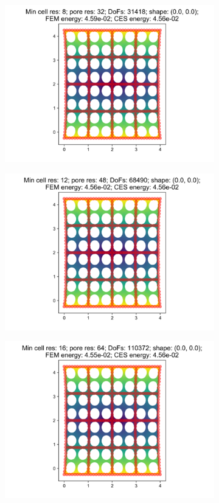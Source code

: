 \begin{figure}[H]
\begin{subfigure}{.45\textwidth}
\end{subfigure}
\begin{subfigure}{.45\textwidth}
  \centering
  \includegraphics[width=.8\linewidth]{lces/vis_tension/bm_4_mesh_3.png}
\end{subfigure}
\newline
\begin{subfigure}{.45\textwidth}
  \centering
  \includegraphics[width=.8\linewidth]{lces/vis_tension/bm_4_mesh_4.png}
\end{subfigure}
\begin{subfigure}{.45\textwidth}
  \centering
  \includegraphics[width=.8\linewidth]{lces/vis_tension/bm_4_mesh_5.png}
\end{subfigure}
\end{figure}

